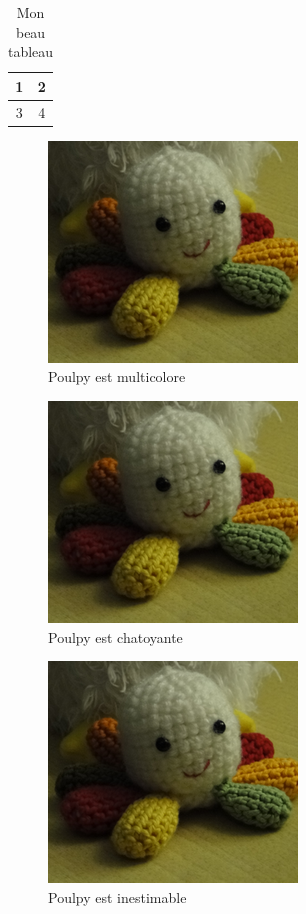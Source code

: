 \documentclass[12pt]{report}
\begin{document}
 
\begin{table}
\begin{center}
\begin{tabular}{|c|c|}
\hline
1 & 2 \\
\hline
3 & 4 \\
\hline
\end{tabular}
\end{center}
\caption[Un tableau]{Mon beau tableau}
\end{table}
 
\begin{figure}
\begin{center}
\includegraphics{poulpy.png} 
\end{center}
\caption{Poulpy est multicolore}
\end{figure}
 
\begin{figure}
\begin{center}
\includegraphics{poulpy.png} 
\end{center}
\caption[Chatoyante]{Poulpy est chatoyante}
\end{figure}
 
\begin{figure}
\begin{center}
\includegraphics{poulpy.png} 
\end{center}
\caption{Poulpy est inestimable}
\end{figure}
 
\end{document}
